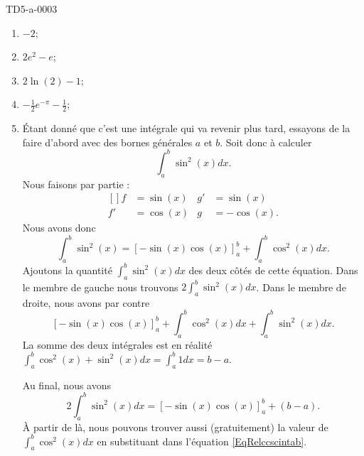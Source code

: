 
\begin{corrige}{TD5-a-0003}

	\begin{enumerate}
		\item
			$-2$;
		\item
			$2e^2-e$;
		\item
			$2\ln(2)-1$;
		\item
			$-\frac{ 1 }{2} e^{-\pi}-\frac{ 1 }{2}$;
		\item
			Étant donné que c'est une intégrale qui va revenir plus tard, essayons de la faire d'abord avec des bornes générales $a$ et $b$. Soit donc à calculer
			\begin{equation}
				\int_a^b\sin^2(x)dx.
			\end{equation}
			Nous faisons par partie :
			\begin{equation}
				\begin{aligned}[]
					f&=\sin(x)	&g'&=\sin(x)\\
					f'&=\cos(x)	&g&=-\cos(x).
				\end{aligned}
			\end{equation}
			Nous avons donc
			\begin{equation}		\label{EqRelccscintab}
				\int_a^b\sin^2(x)=\left[ -\sin(x)\cos(x) \right]_a^b+\int_a^b\cos^2(x)dx.
			\end{equation}
			Ajoutons la quantité $\int_a^b\sin^2(x)dx$ des deux côtés de cette équation. Dans le membre de gauche nous trouvons $2\int_a^b\sin^2(x)dx$. Dans le membre de droite, nous avons par contre
			\begin{equation}
				\left[ -\sin(x)\cos(x) \right]_a^b+\int_a^b\cos^2(x)dx+\int_a^b\sin^2(x)dx.
			\end{equation}
			La somme des deux intégrales est en réalité $\int_a^b\cos^2(x)+\sin^2(x)dx=\int_a^b1dx=b-a$.

			Au final, nous avons
			\begin{equation}
				2\int_a^b\sin^2(x)dx=\left[ -\sin(x)\cos(x) \right]_a^b+(b-a).
			\end{equation}
			À partir de là, nous pouvons trouver aussi (gratuitement) la valeur de $\int_a^b\cos^2(x)dx$ en substituant dans l'équation \eqref{EqRelccscintab}.



\end{enumerate}
\end{corrige}
